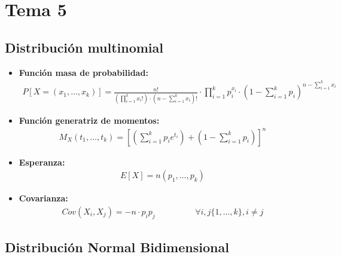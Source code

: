 \documentclass[12pt]{article}
\begin{document}
    \section{Tema 5}
    
    \subsection{Distribución multinomial}

    \begin{itemize}
        \item \textbf{Función masa de probabilidad:}
        \begin{gather*}
            P[X=(x_1, \dots, x_k)] = \frac{n!}{\left(\prod\limits_{i=1}^k x_i!\right) \cdot \left(n- \sum\limits_{i=1}^k x_i\right)!} \cdot \prod\limits_{i=1}^k p_i^{x_i} \cdot \left(1-\sum\limits_{i=1}^k p_i\right)^{n - \sum\limits_{i=1}^k x_i}
        \end{gather*}
        \item \textbf{Función generatriz de momentos:}
        \begin{gather*}
            M_X(t_1,\dots,t_k) = \left[\left(\sum\limits_{i=1}^k p_ie^{t_i}\right) + \left(1 - \sum\limits_{i=1}^k p_i\right)\right]^n
        \end{gather*}
        \item \textbf{Esperanza:}
        \begin{gather*}
            E[X]=n(p_1, \dots, p_k)
        \end{gather*}
        \item \textbf{Covarianza:}
        \begin{gather*}
            Cov(X_i, X_j) = -n \cdot p_ip_j \hspace{2cm} \forall i,j \{1, \dots, k\}, i\neq j
        \end{gather*}
    \end{itemize}

    \subsection{Distribución Normal Bidimensional}

    

    
    
\end{document}
